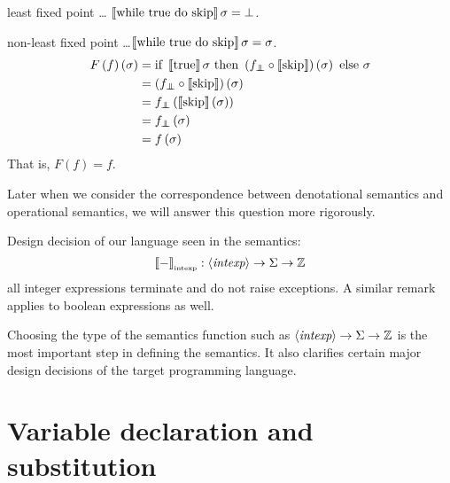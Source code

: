 \begin{enumcirc}
\begin{enumrm}
		least fixed point \dots
		$\left\llbracket \textrm{while } \textrm{true} \textrm{ do } \textrm{skip} \right\rrbracket \sigma = \bot$.
		\item
		non-least fixed point
		\dots $\left\llbracket \textrm{while } \textrm{true} \textrm{ do } \textrm{skip} \right\rrbracket \sigma = \sigma$.
		\begin{align*}
			F\prths{f}\prths{\sigma} & = \cif{\bbrackets{\textrm{true}} \sigma}{\prths{f_\doublebot \circ \bbrackets{\cskip}} \prths{\sigma}}{\sigma} \\
			                         & = \prths{f_\doublebot \circ \bbrackets{\cskip}} \prths{\sigma}                                                 \\
			                         & = f_\doublebot \prths{\bbrackets{\cskip} \prths{\sigma}}                                                       \\
			                         & = f_\doublebot \prths{\sigma}                                                                                  \\
			                         & = f\prths{\sigma}                                                                                              \\
		\end{align*}
		That is, $F(f) = f$.
	\end{enumrm}
	Later when we consider the correspondence between denotational semantics and
	operational semantics, we will answer this question more rigorously.
	\item
	Design decision of our language seen in the semantics:
	\[
		\left\llbracket - \right\rrbracket_{\textrm{\tiny intexp}} : \left\langle \textit{intexp} \right\rangle \to \Sigma \to \mathbb{Z}
	\]
	all integer expressions terminate and do not raise exceptions.
	A similar remark applies to boolean expressions as well.
	\item
	Choosing the type of the semantics function such as
	$\left\langle \textit{intexp} \right\rangle \to \Sigma \to \mathbb{Z}$
	is the most important step in defining the semantics.
	It also clarifies certain major design decisions of the target programming
	language.
\end{enumcirc}

\section{Variable declaration and substitution}

